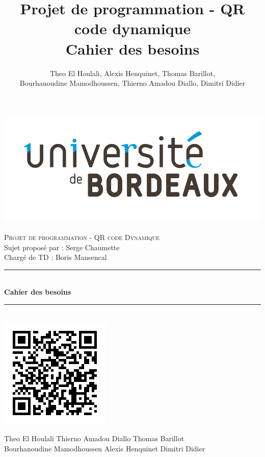\documentclass[a4paper,12pt]{article}
\title{Projet de programmation - QR code dynamique\\Cahier des besoins}
\author{Theo El Houlali, Alexis Henquinet, Thomas Barillot,\\Bourhanoudine Mamodhoussen, Thierno Amadou Diallo, Dimitri Didier
}
\begin{document}
\begin{titlepage}
  \begin{sffamily}
  \begin{center}
	\includegraphics[scale=0.2]{universite.jpg}~\\[1cm]

    \textsc{\Large Projet de programmation - QR code Dynamique }\\[1.5cm]
    Sujet proposé par : Serge Chaumette\\
    Chargé de TD : Boris Mansencal

    \rule{1\linewidth}{2pt}
     \\[1cm]
    { \huge \bfseries Cahier des besoins\\[1cm] }
    \rule{1\linewidth}{2pt}
    \\[3cm]
    \includegraphics[scale=1]{qr.png}
    \\[1cm]

   \vfill
      \begin{center}
        Theo El Houlali \hspace*{3.1cm} Thierno Amadou Diallo \hspace*{1.1cm} Thomas Barillot\\
        Bourhanoudine Mamodhoussen \hspace*{1cm} Alexis Henquinet \hspace*{2cm} Dimitri Didier
      \end{center}
 
 
  \end{center}
  \end{sffamily}
\end{titlepage}
\end{document}
